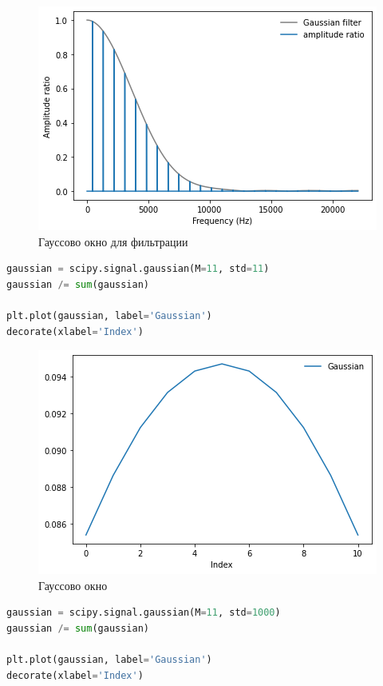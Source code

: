 \begin{figure}[H]
	\begin{center}
		\includegraphics[scale=1]{fig/lab08/lab08_01.png}
		\caption{Гауссово окно для фильтрации}
	\end{center}
\end{figure}

\begin{lstlisting}[language=Python]
gaussian = scipy.signal.gaussian(M=11, std=11)
gaussian /= sum(gaussian)

plt.plot(gaussian, label='Gaussian')
decorate(xlabel='Index')
\end{lstlisting}

\begin{figure}[H]
	\begin{center}
		\includegraphics[scale=0.7]{fig/lab08/lab08_02.png}
		\caption{Гауссово окно}
	\end{center}
\end{figure}

\begin{lstlisting}[language=Python]
gaussian = scipy.signal.gaussian(M=11, std=1000)
gaussian /= sum(gaussian)

plt.plot(gaussian, label='Gaussian')
decorate(xlabel='Index')
\end{lstlisting}

